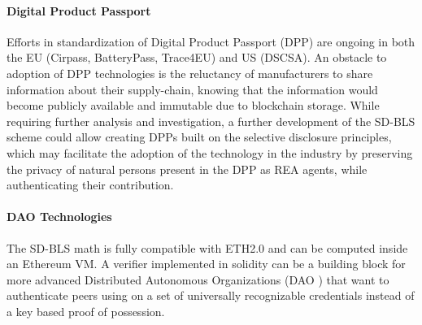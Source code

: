 \paragraph{Digital Product Passport}
Efforts in standardization of Digital Product Passport (DPP) are ongoing in both the EU (Cirpass, BatteryPass, Trace4EU) and US (DSCSA). An obstacle to adoption of DPP technologies is the reluctancy of manufacturers to share information about their supply-chain, knowing that the information would become publicly available and immutable due to blockchain storage. While requiring further analysis and investigation, a further development of the SD-BLS scheme could allow creating DPPs built on the selective disclosure principles, which may facilitate the adoption of the technology in the industry by preserving the privacy of natural persons present in the DPP as REA agents\cite{reflow}, while authenticating their contribution.

\paragraph{DAO Technologies}
The SD-BLS math is fully compatible with ETH2.0 and can be computed inside an Ethereum VM. A verifier implemented in solidity can be a building block for more advanced Distributed Autonomous Organizations (DAO \cite{dao}) that want to authenticate peers using on a set of universally recognizable credentials instead of a key based proof of possession.






